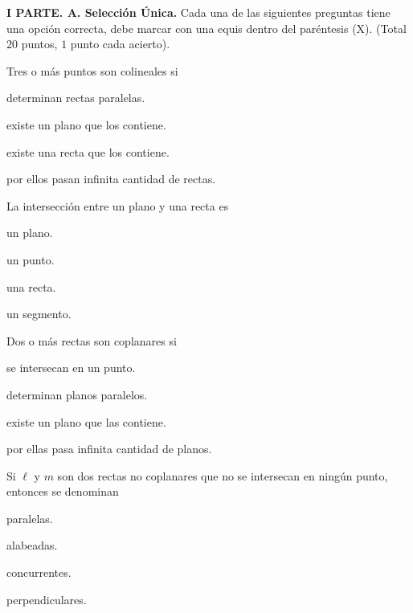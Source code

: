\documentclass[12pt, fleqn]{article}
\begin{document}
\setcounter{page}{2} 

\vspace{-1.5cm}


\sf

{\bf I PARTE. A. Selección Única.} Cada una de las siguientes preguntas tiene una opción correcta, debe marcar con una equis dentro del paréntesis (X). (Total $20$ puntos, $1$ punto cada acierto).

\benu
\item Tres o más puntos son colineales si
\vp

\benu
\item[] \opc determinan rectas paralelas.\vf
\item[] \opc existe un plano que los contiene.\vf
\item[] \opc existe una recta que los contiene.\vf
\item[] \opc por ellos pasan infinita cantidad de rectas.
\eenu
\vs

\item La intersección entre un plano y una recta es
\vp

\benu
\item[] \opc un plano.\vf
\item[] \opc un punto.\vf
\item[] \opc una recta.\vf
\item[] \opc un segmento.
\eenu
\vs

\item Dos o más rectas son coplanares si
\vp

\benu
\item[] \opc se intersecan en un punto.\vf
\item[] \opc determinan planos paralelos.\vf
\item[] \opc existe un plano que las contiene.\vf
\item[] \opc por ellas pasa infinita cantidad de planos.
\eenu
\vs

\item Si $\ell$ y $m$ son dos rectas no coplanares que no se intersecan en ningún punto, entonces se de\-no\-mi\-nan
\vp

\benu
\item[] \opc paralelas.\vf
\item[] \opc alabeadas.\vf
\item[] \opc concurrentes.\vf
\item[] \opc perpendiculares.
\eenu

\pagebreak
\end{document}
